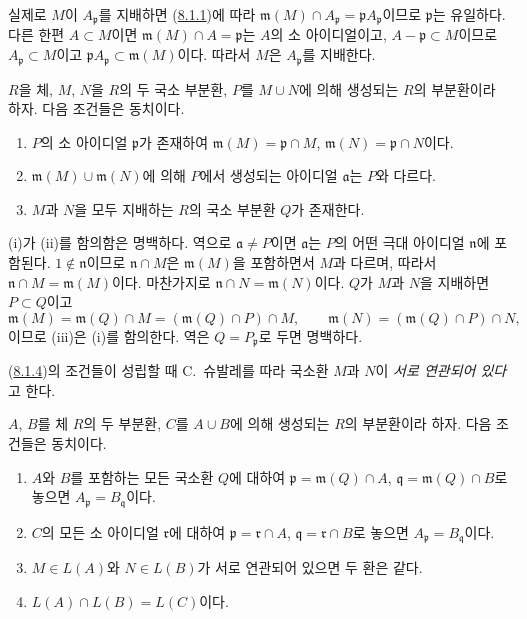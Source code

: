 실제로 $M$이 $A_\mathfrak p$를 지배하면
(\hyperref[I.8.1.1-ko]{8.1.1})에 따라
$\mathfrak m(M)\cap A_\mathfrak p=\mathfrak p A_\mathfrak p$이므로
$\mathfrak p$는 유일하다. 다른 한편 $A\subset M$이면
$\mathfrak m(M)\cap A=\mathfrak p$는 $A$의 소 아이디얼이고,
$A-\mathfrak p\subset M$이므로 $A_\mathfrak p\subset M$이고
$\mathfrak p A_\mathfrak p\subset\mathfrak m(M)$이다. 따라서 $M$은
$A_\mathfrak p$를 지배한다.

\begin{lemma}[8.1.4]
\label{I.8.1.4-ko}
$R$을 체, $M$, $N$을 $R$의 두 국소 부분환, $P$를 $M\cup N$에 의해
생성되는 $R$의 부분환이라 하자. 다음 조건들은 동치이다.
\begin{enumerate}
  \item[(i)] $P$의 소 아이디얼 $\mathfrak p$가 존재하여
    $\mathfrak m(M)=\mathfrak p\cap M$,
    $\mathfrak m(N)=\mathfrak p\cap N$이다.
  \item[(ii)] $\mathfrak m(M)\cup\mathfrak m(N)$에 의해 $P$에서
    생성되는 아이디얼 $\mathfrak a$는 $P$와 다르다.
  \item[(iii)] $M$과 $N$을 모두 지배하는 $R$의 국소 부분환 $Q$가
    존재한다.
\end{enumerate}
\end{lemma}

(i)가 (ii)를 함의함은 명백하다. 역으로 $\mathfrak a\ne P$이면
$\mathfrak a$는 $P$의 어떤 극대 아이디얼 $\mathfrak n$에 포함된다.
$1\notin\mathfrak n$이므로 $\mathfrak n\cap M$은 $\mathfrak m(M)$을
포함하면서 $M$과 다르며, 따라서
$\mathfrak n\cap M=\mathfrak m(M)$이다. 마찬가지로
$\mathfrak n\cap N=\mathfrak m(N)$이다. $Q$가 $M$과 $N$을 지배하면
$P\subset Q$이고
\[
  \mathfrak m(M)=\mathfrak m(Q)\cap M
  =(\mathfrak m(Q)\cap P)\cap M,\qquad
  \mathfrak m(N)=(\mathfrak m(Q)\cap P)\cap N,
\]
이므로 (iii)은 (i)를 함의한다. 역은 $Q=P_\mathfrak p$로 두면
명백하다.

(\hyperref[I.8.1.4-ko]{8.1.4})의 조건들이 성립할 때 C.~슈발레를 따라
국소환 $M$과 $N$이 \emph{서로 연관되어 있다}고 한다.

\begin{proposition}[8.1.5]
\label{I.8.1.5-ko}
$A$, $B$를 체 $R$의 두 부분환, $C$를 $A\cup B$에 의해 생성되는
$R$의 부분환이라 하자. 다음 조건들은 동치이다.
\begin{enumerate}
  \item[(i)] $A$와 $B$를 포함하는 모든 국소환 $Q$에 대하여
    $\mathfrak p=\mathfrak m(Q)\cap A$,
    $\mathfrak q=\mathfrak m(Q)\cap B$로 놓으면
    $A_\mathfrak p=B_\mathfrak q$이다.
  \item[(ii)] $C$의 모든 소 아이디얼 $\mathfrak r$에 대하여
    $\mathfrak p=\mathfrak r\cap A$, $\mathfrak q=\mathfrak r\cap B$로
    놓으면 $A_\mathfrak p=B_\mathfrak q$이다.
  \item[(iii)] $M\in L(A)$와 $N\in L(B)$가 서로 연관되어 있으면
    두 환은 같다.
  \item[(iv)] $L(A)\cap L(B)=L(C)$이다.
\end{enumerate}
\end{proposition}

